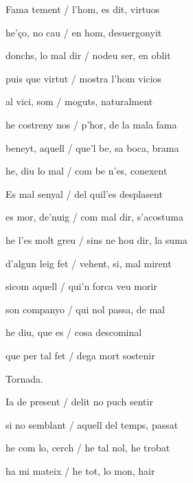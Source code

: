 \documentclass[12pt]{article}
\begin{document}
\begin{estrofa}

 Fama tement / l'hom, es dit, virtuos

 he'\c{c}o, no cau / en hom, desuergonyit

 donchs, lo mal dir / nodeu ser, en oblit

 puis que virtut / mostra l'hom vicios

 al vici, som / moguts, naturalment

 he costreny nos / p'hor, de la mala fama

 beneyt, aquell / que'l be, sa boca, brama

 he, diu lo mal / com be n'es, conexent

\end{estrofa}



\begin{estrofa}

 Es mal senyal / del quil'es desplasent

 es mor, de'nuig / com mal dir, s'acostuma

 he l'es molt greu / sins ne hou dir, la suma

 d'algun leig fet / vehent, si, mal mirent

 sicom aquell / qui'n forca veu morir

 son companyo / qui nol passa, de mal

 he diu, que es / cosa descominal

 que per tal fet / dega mort sostenir

\end{estrofa}


\begin{estrofaExtra}%




\begin{tornada}

Tornada.

\end{tornada}


\end{estrofaExtra}


\begin{estrofa}

 Ia de present / delit no puch sentir

 si no semblant / aquell del temps, passat

 he com lo, cerch / he tal nol, he trobat

 ha mi mateix / he tot, lo mon, hair

\end{estrofa}
\end{document}
